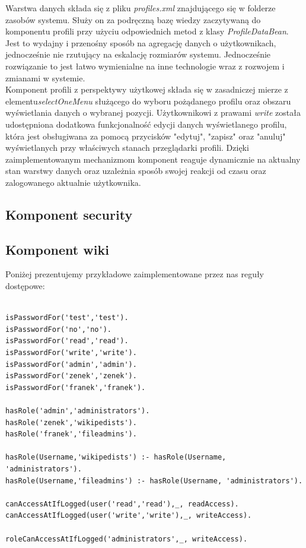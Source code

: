 \documentclass{classrep}
\begin{document}
Warstwa danych składa się z pliku \textit{profiles.xml} znajdującego się w folderze zasobów systemu. Służy on za podręczną bazę wiedzy zaczytywaną do komponentu profili przy użyciu odpowiednich metod z klasy \textit{ProfileDataBean}. Jest to wydajny i przenośny sposób na agregację danych o użytkownikach, jednocześnie nie rzutujący na eskalację rozmiarów systemu. Jednocześnie rozwiązanie to jest łatwo wymienialne na inne technologie wraz z rozwojem i zmianami w systemie. \\
Komponent profili z perspektywy użytkowej składa się w zasadniczej mierze z elementu\textit{selectOneMenu} służącego do wyboru pożądanego profilu oraz obszaru wyświetlania danych o wybranej pozycji. Użytkownikowi z prawami \textit{write} została udostępniona dodatkowa funkcjonalność edycji danych wyświetlanego profilu, która jest obsługiwana za pomocą przycisków "edytuj", "zapisz" oraz "anuluj" wyświetlanych przy właściwych stanach przeglądarki profili. Dzięki zaimplementowanym mechanizmom komponent reaguje dynamicznie na aktualny stan warstwy danych oraz uzależnia sposób swojej reakcji od czasu oraz zalogowanego aktualnie użytkownika.

\subsection{Komponent security}
\subsection{Komponent wiki}

Poniżej prezentujemy przykładowe zaimplementowane przez nas reguły dostępowe:
\begin{verbatim}

isPasswordFor('test','test').
isPasswordFor('no','no').
isPasswordFor('read','read').
isPasswordFor('write','write').
isPasswordFor('admin','admin').
isPasswordFor('zenek','zenek').
isPasswordFor('franek','franek').

hasRole('admin','administrators').
hasRole('zenek','wikipedists').
hasRole('franek','fileadmins').

hasRole(Username,'wikipedists') :- hasRole(Username, 'administrators').
hasRole(Username,'fileadmins') :- hasRole(Username, 'administrators').

canAccessAtIfLogged(user('read','read'),_, readAccess).
canAccessAtIfLogged(user('write','write'),_, writeAccess).

roleCanAccessAtIfLogged('administrators',_, writeAccess).
\end{verbatim}
\end{document}
